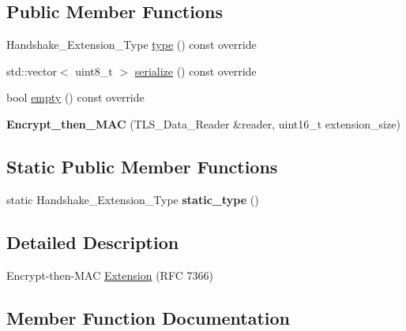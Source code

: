 \subsection*{Public Member Functions}
\begin{DoxyCompactItemize}
\item 
Handshake\+\_\+\+Extension\+\_\+\+Type \hyperlink{class_botan_1_1_t_l_s_1_1_encrypt__then___m_a_c_a56854b4e65b0cf1395b3b053df42f4f3}{type} () const override
\item 
std\+::vector$<$ uint8\+\_\+t $>$ \hyperlink{class_botan_1_1_t_l_s_1_1_encrypt__then___m_a_c_a1d58c33517e89c8e0daa7327bd4783ba}{serialize} () const override
\item 
bool \hyperlink{class_botan_1_1_t_l_s_1_1_encrypt__then___m_a_c_af8412e160e798f87de854889a66faec5}{empty} () const override
\item 
\mbox{\label{class_botan_1_1_t_l_s_1_1_encrypt__then___m_a_c_afe72de65403f8f85c96203ed19f3309b}} 
{\bfseries Encrypt\+\_\+then\+\_\+\+M\+AC} (T\+L\+S\+\_\+\+Data\+\_\+\+Reader \&reader, uint16\+\_\+t extension\+\_\+size)
\end{DoxyCompactItemize}
\subsection*{Static Public Member Functions}
\begin{DoxyCompactItemize}
\item 
\mbox{\label{class_botan_1_1_t_l_s_1_1_encrypt__then___m_a_c_a8abfc8a29dfce0ea83d6d1d6e98a6481}} 
static Handshake\+\_\+\+Extension\+\_\+\+Type {\bfseries static\+\_\+type} ()
\end{DoxyCompactItemize}


\subsection{Detailed Description}
Encrypt-\/then-\/\+M\+AC \hyperlink{class_botan_1_1_t_l_s_1_1_extension}{Extension} (R\+FC 7366) 

\subsection{Member Function Documentation}
\mbox{\label{class_botan_1_1_t_l_s_1_1_encrypt__then___m_a_c_af8412e160e798f87de854889a66faec5}} 
